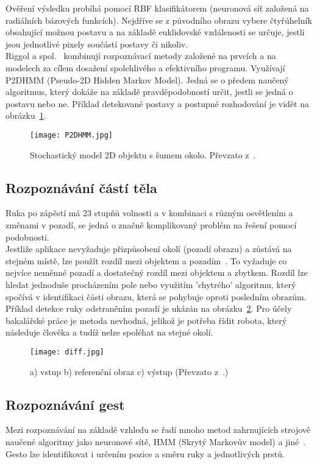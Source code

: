 Ověření výsledku probíhá pomocí RBF klasifikátorem (neuronová síť založená na radiálních bázových funkcích). Nejdříve se z původního obrazu vybere čtyřúhelník obsahující možnou postavu a na základě euklidovské vzdálenosti se určuje, jestli jsou  jednotlivé pixely součástí postavy či nikoliv.\\

Riggol a spol.~\cite{11} kombinují rozpoznávací metody založené na prvcích a na modelech za cílem dosažení spolehlivého a efektivního programu. Využívají P2DHMM (Pseudo-2D Hidden Markov Model). Jedná se o předem naučený algoritmus, který dokáže na základě pravděpodobností určit, jestli se jedná o postavu nebo ne. Příklad detekované postavy a postupné rozhodování je vidět na obrázku~\ref{pic5}.\\
\begin{figure}[h]
\centering
\texttt{[image: P2DHMM.jpg]}
\caption{Stochastický model 2D objektu s šumem okolo. Převzato z~\cite{11}. } %
\label{pic5}
\end{figure}

\subsection{Rozpoznávání částí těla}
Ruka po zápěstí má 23 stupňů volnosti a v kombinaci s různým osvětlením a změnami v pozadí, se jedná o značně komplikovaný problém na řešení pomocí podobnosti.\\

Jestliže aplikace nevyžaduje přizpůsobení okolí (pozadí obrazu) a zůstává na stejném místě, lze použít rozdíl mezi objektem a pozadím~\cite{14}. To vyžaduje co nejvíce neměnné pozadí a dostatečný rozdíl mezi objektem a zbytkem. Rozdíl lze hledat jednoduše procházením pole nebo využitím 'chytrého' algoritmu, který spočívá v identifikaci části obrazu, která se pohybuje oproti posledním obrazům. Příklad detekce ruky odstraněním pozadí je ukázán na obrázku~\ref{pic6}. Pro účely bakalářské práce je metoda nevhodná, jelikož je potřeba řídit robota, který následuje člověka a tudíž nelze spoléhat na stejné okolí.

\begin{figure}[h]
\centering
\texttt{[image: diff.jpg]}
\caption{a) vstup  b) referenční obraz  c) výstup 
(Převzato z~\cite{14}.) } 
\label{pic6}
\end{figure}


\subsection{Rozpoznávání gest}
Mezi rozpoznávání na základě vzhledu se řadí mnoho metod zahrnujících strojově naučené algoritmy jako neuronové sítě, HMM (Skrytý Markovův model) a jiné~\cite{3}. Gesto lze identifikovat i určením pozice a směru ruky a jednotlivých prstů.\\ %

